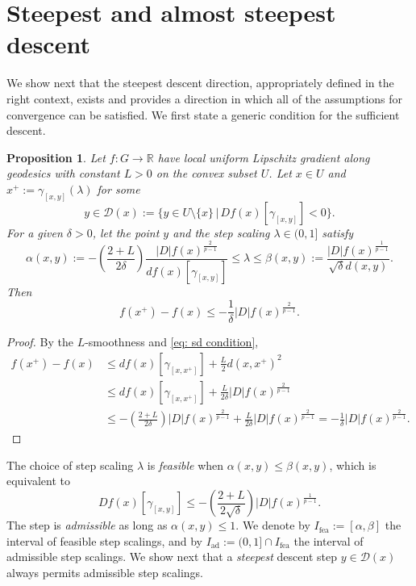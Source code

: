 \documentclass{article}
\theoremstyle{plain}\newtheorem{theorem}{Theorem}[section]
\theoremstyle{plain}\newtheorem{definition}[theorem]{Definition}
\theoremstyle{plain}\newtheorem{lemma}[theorem]{Lemma}
\theoremstyle{definition}\newtheorem{remark}[theorem]{Remark}
\theoremstyle{definition}\newtheorem{example}[theorem]{Example}
\theoremstyle{plain}\newtheorem{proposition}[theorem]{Proposition}
\theoremstyle{plain}\newtheorem{inference}[theorem]{Inference}
\theoremstyle{plain}\newtheorem{corollary}[theorem]{Corollary}
\theoremstyle{plain}\newtheorem{assumption}[theorem]{Assumption}
\begin{document}
\section{Steepest and almost steepest descent}\label{sec: SD method}
We show next that the steepest descent direction, appropriately defined in the right context, exists and provides a direction in which all of the assumptions for convergence can be satisfied. We first state a generic condition for the sufficient descent.
\begin{proposition}\label{pr: suff cond for SD}
    Let $f:G\to\mathbb{R}$ have local uniform Lipschitz gradient along geodesics with constant $L>0$ on the convex subset $U$. Let $x\in U$ and $x^+:=\gamma_{[x,y]}(\lambda)$ for some
    $$
    y\in\mathcal{D}(x):=\bigl\{ y\in U\setminus\{x\} \,\big|\, Df(x)[\gamma_{[x,y]}]<0 \bigr\}.
    $$
    For a given $\delta>0$, let the point $y$ and the step scaling $\lambda\in(0,1]$ satisfy
    \begin{equation}\label{eq: sd condition}
        \alpha(x,y):=-\left(\frac{2+L}{2\delta}\right)\frac{|D|f(x)^{\frac{2}{p-1}}}{df(x)[\gamma_{[x,y]}]}\leq \lambda\leq\beta(x,y):=\frac{|D|f(x)^{\frac{1}{p-1}}}{\sqrt{\delta}d(x,y)}.
    \end{equation}
    Then
    $$
    f(x^+)-f(x)\leq-\frac{1}{\delta}|D|f(x)^{\frac{2}{p-1}}.
    $$
\end{proposition}
\begin{proof}
    By the $L$-smoothness and \eqref{eq: sd condition},
    \begin{align*}
        f(x^+)-f(x)&\leq df(x)[\gamma_{[x,x^+]}]+\frac{L}{2}d(x,x^+)^2\\
        &\leq df(x)[\gamma_{[x,x^+]}]+\frac{L}{2\delta}|D|f(x)^{\frac{2}{p-1}}\\
        &\leq-\left(\frac{2+L}{2\delta}\right)|D|f(x)^{\frac{2}{p-1}}+\frac{L}{2\delta}|D|f(x)^{\frac{2}{p-1}}=-\frac{1}{\delta}|D|f(x)^{\frac{2}{p-1}}.
    \end{align*}
\end{proof}
The choice of step scaling $\lambda$ is {\em feasible} when $\alpha(x,y)\leq\beta(x,y)$, which is equivalent to
\begin{equation}\label{eq: sd condition eq}
    Df(x)[\gamma_{[x,y]}]\leq-\left(\frac{2+L}{2\sqrt{\delta}}\right)|D|f(x)^{\frac{1}{p-1}}.
\end{equation}
The step is {\em admissible} as long as $\alpha(x,y)\leq 1$.
We denote by $I_{\mathrm{fea}}:=[\alpha,\beta]$ the interval of feasible step scalings, and by $I_{\mathrm{ad}}:=(0,1]\cap I_{\mathrm{fea}}$ the interval of admissible step scalings. We show next that a {\em steepest } descent step $y\in\mathcal{D}(x)$ always permits admissible step scalings.
\end{document}
